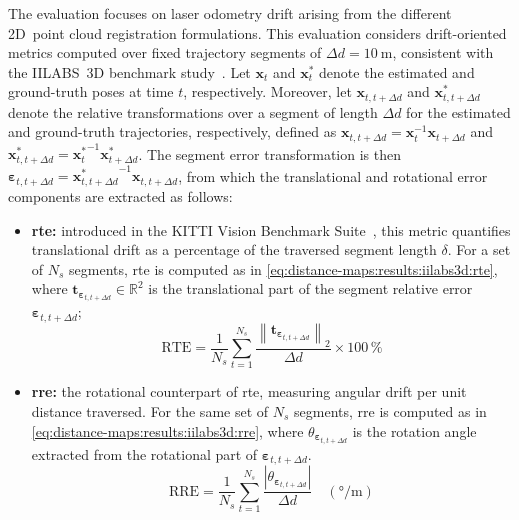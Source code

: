 The evaluation focuses on laser odometry drift arising from the different
2D~point cloud registration formulations. This evaluation considers
drift-oriented metrics computed over fixed trajectory segments of
$\Delta d = \SI{10}{\metre}$, consistent with the IILABS~3D
benchmark study~\cite{ribeiro:access:2025}.
Let $\mathbf{x}_t$ and $\mathbf{x}_t^*$ denote the estimated and
ground-truth poses at time $t$, respectively. Moreover, let
$\mathbf{x}_{t,t+\Delta d}$ and $\mathbf{x}^*_{t,t+\Delta d}$ denote
the relative transformations over a segment of length $\Delta d$ for the
estimated and ground-truth trajectories, respectively, defined as
$\mathbf{x}_{t,t+\Delta d} = \mathbf{x}_t^{-1} \mathbf{x}_{t+\Delta d}$
and
$\mathbf{x}^*_{t,t+\Delta d} = {\mathbf{x}_t^*}^{-1} \mathbf{x}^*_{t+\Delta d}$.
The segment error transformation is then
$\boldsymbol{\varepsilon}_{t,t+\Delta d} = {\mathbf{x}^*_{t,t+\Delta d}}^{-1}\mathbf{x}_{t,t+\Delta d}$,
from which the translational and rotational error components are extracted
as follows:
\begin{itemize}
\item \textbf{\gls{rte}:} introduced in the KITTI Vision Benchmark
      Suite~\cite{geiger:cvpr:2012}, this metric quantifies translational
      drift as a percentage of the traversed segment length $\delta$.
      For a set of $N_s$ segments, \gls{rte} is computed as in
      \eqref{eq:distance-maps:results:iilabs3d:rte}, where
      $\mathbf{t}_{\boldsymbol{\varepsilon}_{t,t+\Delta d}} \in \mathbb{R}^2$
      is the translational part of the segment relative error
      $\boldsymbol{\varepsilon}_{t,t+\Delta d}$;
      \begin{equation}
      \label{eq:distance-maps:results:iilabs3d:rte}
      \mathrm{RTE} =
      \frac{1}{N_s} \sum_{t=1}^{N_s}
      \frac{\left\| \mathbf{t}_{\boldsymbol{\varepsilon}_{t,t+\Delta d}} \right\|_2}{\Delta d}
      \times 100\,\%
      \end{equation}
\item \textbf{\gls{rre}:} the rotational counterpart of \gls{rte},
      measuring angular drift per unit distance traversed.
      For the same set of $N_s$ segments, \gls{rre} is computed as in
      \eqref{eq:distance-maps:results:iilabs3d:rre},
      where $\theta_{\boldsymbol{\varepsilon}_{t,t+\Delta d}}$ is the rotation
      angle extracted from the rotational part of
      $\boldsymbol{\varepsilon}_{t,t+\Delta d}$.
      \begin{equation}
      \label{eq:distance-maps:results:iilabs3d:rre}
      \mathrm{RRE} =
      \frac{1}{N_s} \sum_{t=1}^{N_s}
      \frac{\left| \theta_{\boldsymbol{\varepsilon}_{t,t+\Delta d}} \right|}{\Delta d}
      \quad \left(\si{\degree\per\metre}\right)
      \end{equation}
\end{itemize}

